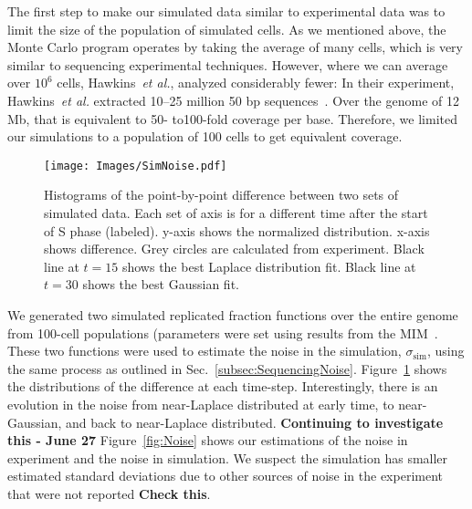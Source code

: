 		The first step to make our simulated data similar to experimental data was to limit the size of the population of simulated cells.
		As we mentioned above, the Monte Carlo program operates by taking the average of many cells, which is very similar to sequencing experimental techniques.
		However, where we can average over $10^6$ cells, Hawkins~\emph{et al.}, analyzed considerably fewer:
		In their experiment, Hawkins~\emph{et al.} extracted 10--25 million 50 bp sequences~\cite{StochasticTermination}.
		Over the genome of 12 Mb, that is equivalent to 50- to100-fold coverage per base.
		Therefore, we limited our simulations to a population of 100 cells to get equivalent coverage.
		
		\begin{figure}[tbh]
			\begin{center}
				\texttt{[image: Images/SimNoise.pdf]}
			\end{center}
				\caption[Estimating Simulation Noise]{\label{fig:SimNoise} Histograms of the point-by-point difference between two sets of simulated data.
					Each set of axis is for a different time after the start of S phase (labeled).
					y-axis shows the normalized distribution.
					x-axis shows difference.
					Grey circles are calculated from experiment.
					Black line at $t=15$ shows the best Laplace distribution fit.
					Black line at $t=30$ shows the best Gaussian fit.
				}
		\end{figure}
		
		We generated two simulated replicated fraction functions over the entire genome from 100-cell populations (parameters were set using results from the MIM~\cite{ScottsPaper}.
		These two functions were used to estimate the noise in the simulation, $\sigma_\text{sim}$, using the same process as outlined in Sec.~\ref{subsec:SequencingNoise}.
		Figure~\ref{fig:SimNoise} shows the distributions of the difference at each time-step.
		Interestingly, there is an evolution in the noise from near-Laplace distributed at early time, to near-Gaussian, and back to near-Laplace distributed.
		\textbf{Continuing to investigate this - June 27}
		Figure~\ref{fig:Noise} shows our estimations of the noise in experiment and the noise in simulation.
		We suspect the simulation has smaller estimated standard deviations due to other sources of noise in the experiment that were not reported \textbf{Check this}.
		

